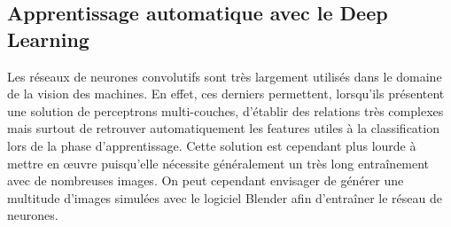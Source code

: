 \documentclass[a4paper, 11pt]{article}
\begin{document}
		\subsection*{Apprentissage automatique avec le Deep Learning}
		Les réseaux de neurones convolutifs sont très largement utilisés dans le domaine de la vision des machines. En effet, ces derniers permettent, lorsqu'ils présentent une solution de perceptrons multi-couches, d'établir des relations très complexes mais surtout de retrouver automatiquement les features utiles à la classification lors de la phase d'apprentissage. Cette solution est cependant plus lourde à mettre en \oe{}uvre puisqu'elle nécessite généralement un très long entraînement avec de nombreuses images. On peut cependant envisager de générer une multitude d'images simulées avec le logiciel Blender afin d'entraîner le réseau de neurones.

	
\end{document}
